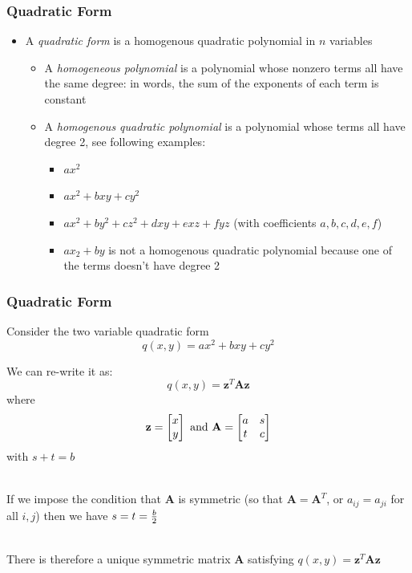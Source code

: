 \documentclass[handout]{beamer}
\numberwithin{equation}{section}
\begin{document}
\begin{frame}
\frametitle{Quadratic Form}

\begin{itemize}
\item A \textit{quadratic form} is a homogenous quadratic polynomial in $n$ variables \pause
\begin{itemize}
\item A \textit{homogeneous polynomial} is a polynomial whose nonzero terms all have the same degree: in words, the sum of the exponents of each term is constant \pause
\item A \textit{homogenous quadratic polynomial} is a polynomial whose terms all have degree 2, see following examples: \pause

\begin{itemize}
\item $a x^2$
\item $ax^2+bxy+cy^2$
\item $a x^2+b y^2+c z^2+d xy+e xz+f yz$ (with coefficients $a, b, c, d, e, f$) \pause
\item $a x_{2} + b y$ is not a homogenous quadratic polynomial because one of the terms doesn't have degree 2
\end{itemize}

\end{itemize}

\end{itemize}

\end{frame}



\begin{frame}
\frametitle{Quadratic Form}

Consider the two variable quadratic form
$$q(x, y)=ax^2+bxy+cy^2$$ \pause

We can re-write it as: $$q(x, y)=\mathbf{z}^T\mathbf{A}\mathbf{z}$$ where $$\mathbf{z}=\begin{bmatrix}
x\\y
\end{bmatrix} \hbox{ and }\mathbf{A}=
\begin{bmatrix}
a & s \\
t& c
\end{bmatrix} 
$$
with $s+t=b$ \pause

\ \\If we impose the condition that $\mathbf{A}$ is symmetric (so that $\mathbf{A}=\mathbf{A}^T$, or $a_{ij}=a_{ji}$ for all $i, j$) then we have $s=t={b\over 2}$ \pause
 
 \ \\There is therefore a unique symmetric matrix $\mathbf{A}$ satisfying $q(x, y)=\mathbf{z}^T\mathbf{A}\mathbf{z}$

\end{frame}
\end{document}
